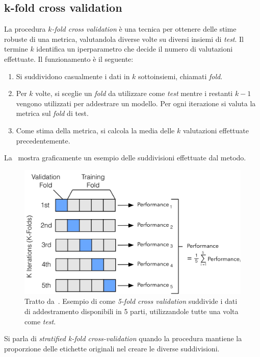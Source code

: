 \subsection{k-fold cross validation}
La procedura $k$\emph{-fold cross validation} è una tecnica per ottenere delle stime robuste di una metrica, valutandola diverse volte su diversi insiemi di \emph{test}.
Il termine $k$ identifica un iperparametro che decide il numero di valutazioni effettuate.
Il funzionamento è il seguente:
\begin{enumerate}
    \item Si suddividono casualmente i dati in $k$ sottoinsiemi, chiamati \emph{fold}.
    \item Per $k$ volte, si sceglie un \emph{fold} da utilizzare come \emph{test} mentre i restanti $k-1$ vengono utilizzati per addestrare un modello. Per ogni iterazione si valuta la metrica sul \emph{fold} di test.
    \item Come stima della metrica, si calcola la media delle $k$ valutazioni effettuate precedentemente.
\end{enumerate}
La~ mostra graficamente un esempio delle suddivisioni effettuate dal metodo.
\begin{figure}
    \centering
    \includegraphics[width=0.7\linewidth]{img/kfoldCV.jpg}
    \caption{Tratto da~\cite{model_evaluation}. Esempio di come \emph{5-fold cross validation} suddivide i dati di addestramento disponibili in 5 parti, utilizzandole tutte una volta come \emph{test}.}
    \label{fig:kfoldcv}
\end{figure}
Si parla di \emph{stratified k-fold cross-validation} quando la procedura mantiene la proporzione delle etichette originali nel creare le diverse suddivisioni.


